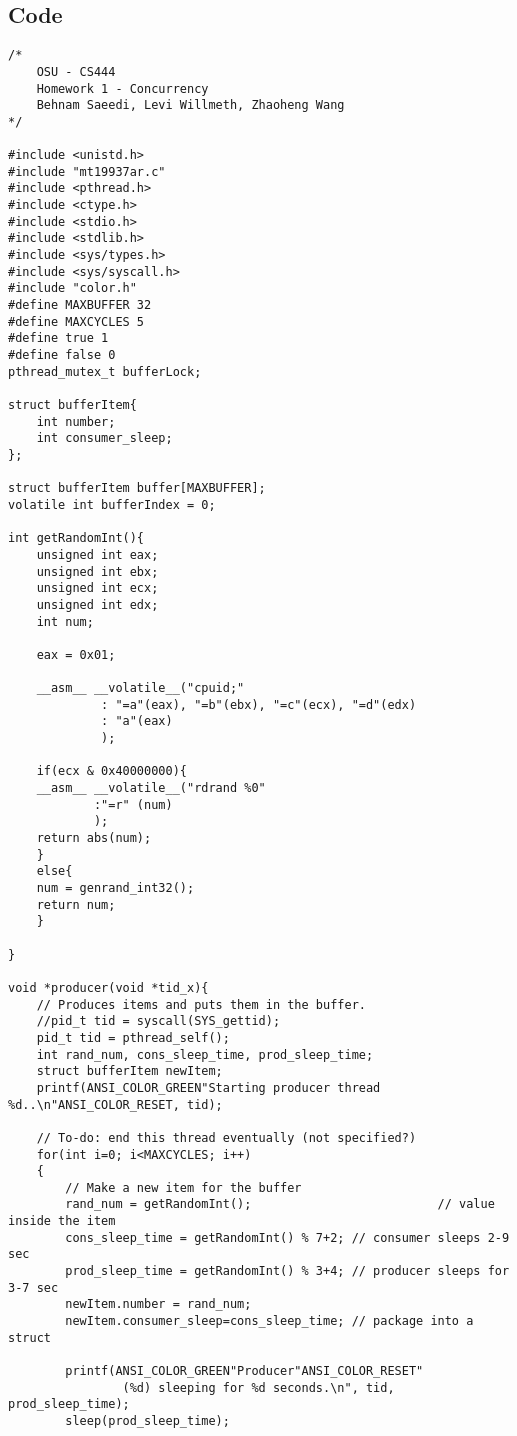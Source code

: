 \documentclass[journal,10pt,onecolumn,compsoc,letterpaper,draftclsnofoot,table,xcdraw]{IEEEtran} \usepackage[margin=0.75in]{geometry}
\begin{document}
\subsection{Code}
\begin{verbatim}
/*
	OSU - CS444
	Homework 1 - Concurrency
	Behnam Saeedi, Levi Willmeth, Zhaoheng Wang
*/

#include <unistd.h>
#include "mt19937ar.c"
#include <pthread.h>
#include <ctype.h>
#include <stdio.h>
#include <stdlib.h>
#include <sys/types.h>
#include <sys/syscall.h>
#include "color.h"
#define MAXBUFFER 32
#define MAXCYCLES 5
#define true 1
#define false 0
pthread_mutex_t bufferLock;

struct bufferItem{
	int number;
	int consumer_sleep;
};

struct bufferItem buffer[MAXBUFFER];
volatile int bufferIndex = 0;

int getRandomInt(){
	unsigned int eax;
	unsigned int ebx;
	unsigned int ecx;
	unsigned int edx;
	int num;

	eax = 0x01;

	__asm__ __volatile__("cpuid;"
			 : "=a"(eax), "=b"(ebx), "=c"(ecx), "=d"(edx)
			 : "a"(eax)
			 );

	if(ecx & 0x40000000){
	__asm__ __volatile__("rdrand %0"
			:"=r" (num)
			);
	return abs(num);
	}
	else{
	num = genrand_int32();
	return num;
	}

}

void *producer(void *tid_x){
	// Produces items and puts them in the buffer.
	//pid_t tid = syscall(SYS_gettid);
	pid_t tid = pthread_self();
    int rand_num, cons_sleep_time, prod_sleep_time;
	struct bufferItem newItem;
	printf(ANSI_COLOR_GREEN"Starting producer thread %d..\n"ANSI_COLOR_RESET, tid);

	// To-do: end this thread eventually (not specified?)
    for(int i=0; i<MAXCYCLES; i++)
	{
		// Make a new item for the buffer
		rand_num = getRandomInt();							// value inside the item
		cons_sleep_time = getRandomInt() % 7+2; // consumer sleeps 2-9 sec
		prod_sleep_time = getRandomInt() % 3+4; // producer sleeps for 3-7 sec
		newItem.number = rand_num;
		newItem.consumer_sleep=cons_sleep_time;	// package into a struct

		printf(ANSI_COLOR_GREEN"Producer"ANSI_COLOR_RESET" 
        		(%d) sleeping for %d seconds.\n", tid, prod_sleep_time);
		sleep(prod_sleep_time);


\end{verbatim}
\end{document}
